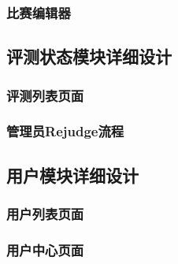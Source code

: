 \subsubsection{比赛编辑器}

\subsection{评测状态模块详细设计}
\subsubsection{评测列表页面}
\subsubsection{管理员Rejudge流程}

\subsection{用户模块详细设计}
\subsubsection{用户列表页面}
\subsubsection{用户中心页面}